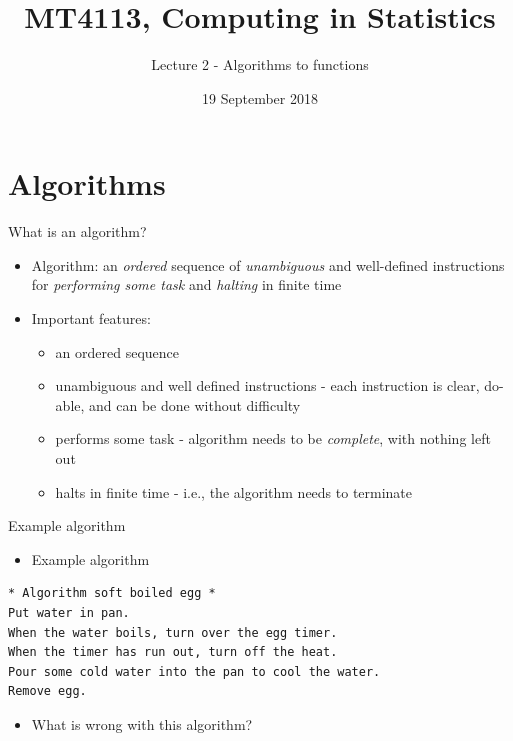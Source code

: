 \documentclass[ignorenonframetext,]{beamer}
\title{MT4113, Computing in Statistics}
\author{Lecture 2 - Algorithms to functions}
\date{19 September 2018}
\providecommand{\tightlist}{%
  \setlength{\itemsep}{0pt}\setlength{\parskip}{0pt}}
\begin{document}
\frame{\titlepage}

\begin{frame}
\tableofcontents[hideallsubsections]
\end{frame}

\begin{frame}

\end{frame}

\section{Algorithms}\label{algorithms}

\begin{frame}{What is an algorithm?}

\begin{itemize}[<+->]
\tightlist
\item
  Algorithm: an \emph{ordered} sequence of \emph{unambiguous} and
  well-defined instructions for \emph{performing some task} and
  \emph{halting} in finite time
\item
  Important features:

  \begin{itemize}[<+->]
  \tightlist
  \item
    an ordered sequence
  \item
    unambiguous and well defined instructions - each instruction is
    clear, do-able, and can be done without difficulty
  \item
    performs some task - algorithm needs to be \emph{complete}, with
    nothing left out
  \item
    halts in finite time - i.e., the algorithm needs to terminate
  \end{itemize}
\end{itemize}

\end{frame}

\begin{frame}[fragile]{Example algorithm}

\begin{itemize}[<+->]
\tightlist
\item
  Example algorithm
\end{itemize}

\begin{verbatim}
* Algorithm soft boiled egg *
Put water in pan.
When the water boils, turn over the egg timer.
When the timer has run out, turn off the heat.
Pour some cold water into the pan to cool the water.
Remove egg.
\end{verbatim}

\begin{itemize}[<+->]
\tightlist
\item
  What is wrong with this algorithm?
\end{itemize}

\end{frame}
\end{document}
